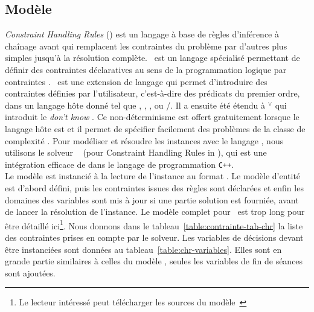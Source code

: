 \subsection{Modèle \CHR{}}

{\it Constraint Handling Rules} ({\CHR}) \cite{Fruhwirth_JLP_98,Fruhwirth_CHR_09} est un langage à base de règles d’inférence à chaînage avant qui remplacent les contraintes du problème
par d’autres plus simples jusqu’à la résolution complète.
\CHR\ est un langage spécialisé permettant de définir des contraintes déclaratives au sens de la programmation logique par contraintes \cite{VanHentenryck_ker_91,Jaffar_Malher_JLP_94}.
\CHR\ est une extension de langage qui permet d'introduire des contraintes définies par l'utilisateur, c'est-à-dire des prédicats du premier ordre, dans un langage hôte donné tel que {\PROLOG}, {\LISP}, {\JAVA}, ou {\C}/{\CPP}.
Il a ensuite été étendu à {\CHR}\ensuremath{^{\vee}} \cite{Abdennadher_Schutz_FQAS_98} qui introduit le \emph{don't know} \cite{Betz_Fruhwirth_TCL_13}.
Ce non-déterminisme est offert gratuitement lorsque le langage hôte est {\PROLOG} et il permet de spécifier facilement des problèmes de la classe de complexité {\NP}. Pour modéliser et résoudre les instances {\UTP} avec le langage {\CHR}, nous utilisons le solveur {\CHRPP}~\cite{barichard_stephan_2019} (pour Constraint Handling Rules in {\CPP}), qui est une intégration efficace de {\CHR} dans le langage de programmation \texttt{C++}.\\

Le modèle \CHR{} est instancié à la lecture de l'instance au format \JSON{}.
Le modèle d'entité est d'abord défini, puis les contraintes issues des règles sont déclarées et enfin les domaines des variables sont mis à jour si une partie solution est fourniée, avant de lancer la résolution de l'instance.
%
Le modèle complet pour \CHRPP\ est trop long pour être détaillé ici\footnote{Le lecteur intéressé peut télécharger les sources du modèle~\cite{uspSite}}. Nous donnons dans le tableau~\ref{table:contrainte-tab-chr} la liste des contraintes prises en compte par le solveur. Les variables de décisions devant être instanciées sont données au tableau~\ref{table:chr-variables}. Elles sont en grande partie similaires à celles du modèle \MINIZINC, seules les variables de fin de séances sont ajoutées.\\

\begin{table*}[!ht]
\caption{Variables de décision (\CHR)}
\label{table:chr-variables}
\end{table*}

